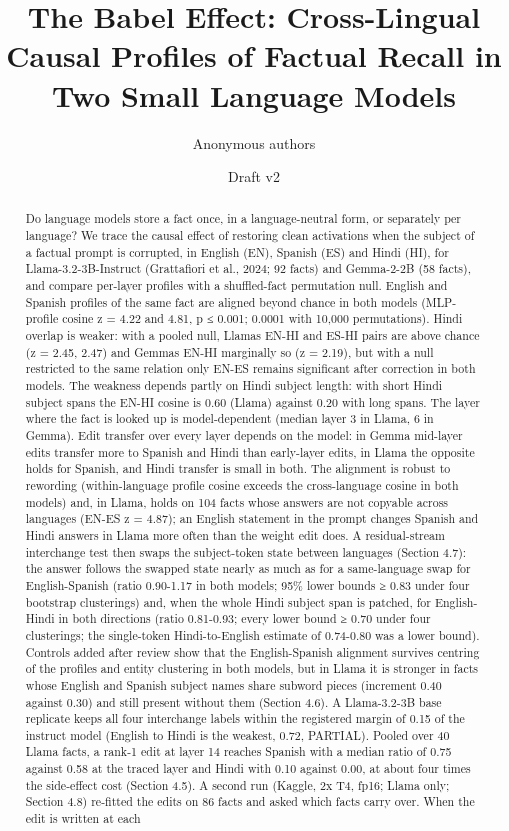 \documentclass[11pt]{article}
\title{The Babel Effect: Cross-Lingual Causal Profiles of Factual Recall in Two Small Language Models}
\author{Anonymous authors}
\date{Draft v2}
\begin{document}
\maketitle
\begin{abstract}
Do language models store a fact once, in a language-neutral form, or separately per language? We trace the causal effect of restoring clean activations when the subject of a factual prompt is corrupted, in English (EN), Spanish (ES) and Hindi (HI), for Llama-3.2-3B-Instruct (Grattafiori et al., 2024; 92 facts) and Gemma-2-2B (58 facts), and compare per-layer profiles with a shuffled-fact permutation null. English and Spanish profiles of the same fact are aligned beyond chance in both models (MLP-profile cosine z = 4.22 and 4.81, p ≤ 0.001; 0.0001 with 10,000 permutations). Hindi overlap is weaker: with a pooled null, Llama\textquotesingle s EN-HI and ES-HI pairs are above chance (z = 2.45, 2.47) and Gemma\textquotesingle s EN-HI marginally so (z = 2.19), but with a null restricted to the same relation only EN-ES remains significant after correction in both models. The weakness depends partly on Hindi subject length: with short Hindi subject spans the EN-HI cosine is 0.60 (Llama) against 0.20 with long spans. The layer where the fact is looked up is model-dependent (median layer 3 in Llama, 6 in Gemma). Edit transfer over every layer depends on the model: in Gemma mid-layer edits transfer more to Spanish and Hindi than early-layer edits, in Llama the opposite holds for Spanish, and Hindi transfer is small in both. The alignment is robust to rewording (within-language profile cosine exceeds the cross-language cosine in both models) and, in Llama, holds on 104 facts whose answers are not copyable across languages (EN-ES z = 4.87); an English statement in the prompt changes Spanish and Hindi answers in Llama more often than the weight edit does. A residual-stream interchange test then swaps the subject-token state between languages (Section 4.7): the answer follows the swapped state nearly as much as for a same-language swap for English-Spanish (ratio 0.90-1.17 in both models; 95\% lower bounds ≥ 0.83 under four bootstrap clusterings) and, when the whole Hindi subject span is patched, for English-Hindi in both directions (ratio 0.81-0.93; every lower bound ≥ 0.70 under four clusterings; the single-token Hindi-to-English estimate of 0.74-0.80 was a lower bound). Controls added after review show that the English-Spanish alignment survives centring of the profiles and entity clustering in both models, but in Llama it is stronger in facts whose English and Spanish subject names share subword pieces (increment 0.40 against 0.30) and still present without them (Section 4.6). A Llama-3.2-3B base replicate keeps all four interchange labels within the registered margin of 0.15 of the instruct model (English to Hindi is the weakest, 0.72, PARTIAL). Pooled over 40 Llama facts, a rank-1 edit at layer 14 reaches Spanish with a median ratio of 0.75 against 0.58 at the traced layer and Hindi with 0.10 against 0.00, at about four times the side-effect cost (Section 4.5). A second run (Kaggle, 2x T4, fp16; Llama only; Section 4.8) re-fitted the edits on 86 facts and asked which facts carry over. When the edit is written at each 
\end{abstract}
\end{document}
